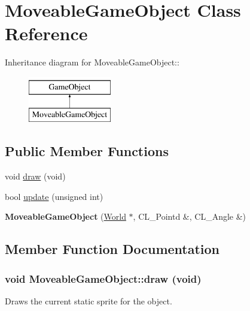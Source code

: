 \hypertarget{classMoveableGameObject}{
\section{MoveableGameObject Class Reference}
\label{classMoveableGameObject}
}
Inheritance diagram for MoveableGameObject::\begin{figure}[H]
\begin{center}
\leavevmode
\includegraphics[height=2cm]{classMoveableGameObject}
\end{center}
\end{figure}
\subsection*{Public Member Functions}
\begin{DoxyCompactItemize}
\item 
void \hyperlink{classMoveableGameObject_a6110e3bcfb088cfaa53bc81ce220bab1}{draw} (void)
\item 
bool \hyperlink{classMoveableGameObject_af2a5d981743e85b4bd35a90f874b361b}{update} (unsigned int)
\item 
\hypertarget{classMoveableGameObject_a35e6de5de69921201d48989af9310b71}{
{\bfseries MoveableGameObject} (\hyperlink{classWorld}{World} $\ast$, CL\_\-Pointd \&, CL\_\-Angle \&)}
\label{classMoveableGameObject_a35e6de5de69921201d48989af9310b71}

\end{DoxyCompactItemize}


\subsection{Member Function Documentation}
\hypertarget{classMoveableGameObject_a6110e3bcfb088cfaa53bc81ce220bab1}{
\subsubsection[{draw}]{\setlength{\rightskip}{0pt plus 5cm}void MoveableGameObject::draw (void)}}
\label{classMoveableGameObject_a6110e3bcfb088cfaa53bc81ce220bab1}
Draws the current static sprite for the object. 

